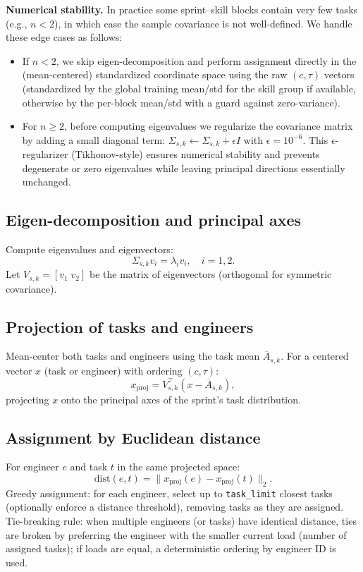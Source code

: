 \documentclass[final,1p,times]{elsarticle}
\begin{document}
\noindent\textbf{Numerical stability.} In practice some sprint–skill blocks contain very few tasks (e.g., $n<2$), in which case the sample covariance is not well-defined. We handle these edge cases as follows:
\begin{itemize}[leftmargin=*]
    \item If $n<2$, we skip eigen-decomposition and perform assignment directly in the (mean-centered) standardized coordinate space using the raw $(c,\tau)$ vectors (standardized by the global training mean/std for the skill group if available, otherwise by the per-block mean/std with a guard against zero-variance). 
    \item For $n\ge2$, before computing eigenvalues we regularize the covariance matrix by adding a small diagonal term: $\Sigma_{s,k}\leftarrow\Sigma_{s,k}+\epsilon I$ with $\epsilon=10^{-6}$. This $\epsilon$-regularizer (Tikhonov-style) ensures numerical stability and prevents degenerate or zero eigenvalues while leaving principal directions essentially unchanged.
\end{itemize}

\subsection{Eigen-decomposition and principal axes}
Compute eigenvalues and eigenvectors:
\[
\Sigma_{s,k} v_i = \lambda_i v_i, \quad i=1,2.
\]
Let $V_{s,k} = [v_1 \; v_2]$ be the matrix of eigenvectors (orthogonal for symmetric covariance).

\subsection{Projection of tasks and engineers}
Mean-center both tasks and engineers using the task mean $\overline{A}_{s,k}$. For a centered vector $x$ (task or engineer) with ordering $(c,\tau)$:
\begin{equation}
\label{eq:proj}
x_{\text{proj}} = V_{s,k}^\top (x - \overline{A}_{s,k}),
\end{equation}
projecting $x$ onto the principal axes of the sprint's task distribution.

\subsection{Assignment by Euclidean distance}
For engineer $e$ and task $t$ in the same projected space:
\begin{equation}
\label{eq:euclid}
\mathrm{dist}(e,t) = \| x_{\text{proj}}(e) - x_{\text{proj}}(t) \|_2.
\end{equation}
Greedy assignment: for each engineer, select up to \texttt{task\_limit} closest tasks (optionally enforce a distance threshold), removing tasks as they are assigned. Tie-breaking rule: when multiple engineers (or tasks) have identical distance, ties are broken by preferring the engineer with the smaller current load (number of assigned tasks); if loads are equal, a deterministic ordering by engineer ID is used.
\end{document}
